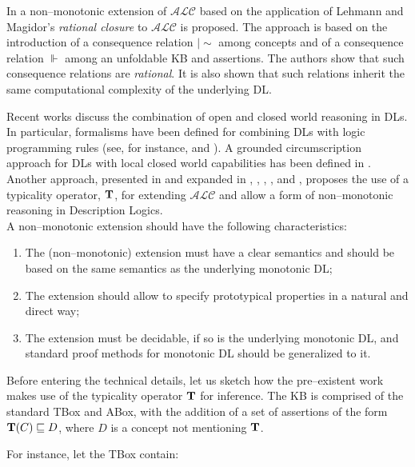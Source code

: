 \documentclass[a4paper, 11pt, oneside]{duthesis}
\newcommand {\ent} {\mathrel{{\scriptstyle\mid\!\sim}}}
\newcommand{\tip}{{\bf T}}
\newcommand{\alc}{\mathcal{ALC}}
\begin{document}
In \cite{casinistraccia2010,stracciaijcai2011} a non--monotonic extension of $\mathcal{ALC}$  based on the application of Lehmann and Magidor's \emph{rational closure} \cite{whatdoes} to $\mathcal{ALC}$ is proposed. The approach is based on the introduction of a consequence relation $\ent$ among concepts and of a consequence relation $\Vdash$ among an unfoldable KB and assertions. The authors show that such consequence relations are \emph{rational}. It is also shown that such relations inherit the same computational complexity of the underlying DL.

Recent works discuss the combination of open and closed world reasoning in DLs. In particular, formalisms have been defined for combining DLs with logic programming rules (see, for instance, \cite{eiter2004} and \cite{rosatiacm}). A grounded circumscription approach for DLs with local closed world capabilities has been defined in \cite{hitzlerdl}.\\

Another approach, presented in \cite{tr2008} and expanded in \cite{trfundam} \cite{FI09}, \cite{aiia2011}, \cite{tableaux2011DLs}, \cite{Giordano:2013:NDL:2435476.2435957}, and \cite{conf/aiia/GiordanoGJOP13}, proposes the use of a typicality operator, $\tip$, for extending $\alc$ and allow a form of non--monotonic reasoning in Description Logics.\\

A non--monotonic extension should have the following characteristics:

\begin{enumerate}
\item The (non--monotonic) extension must have a clear semantics and should be based on the same semantics as the underlying monotonic DL;
\item The extension should allow to specify prototypical properties in a natural and direct way;
\item The extension must be decidable, if  so is the underlying monotonic DL, and standard proof methods for monotonic DL should be generalized to it.
\end{enumerate}

Before entering the technical details, let us sketch how the pre--existent work makes use of the typicality operator $\tip$ for inference. The KB is comprised of the standard TBox and ABox, with the addition of a set of assertions of the form $\tip(C)\sqsubseteq D$, where $D$ is a concept not mentioning $\tip$.

For instance, let the TBox contain:
\end{document}
